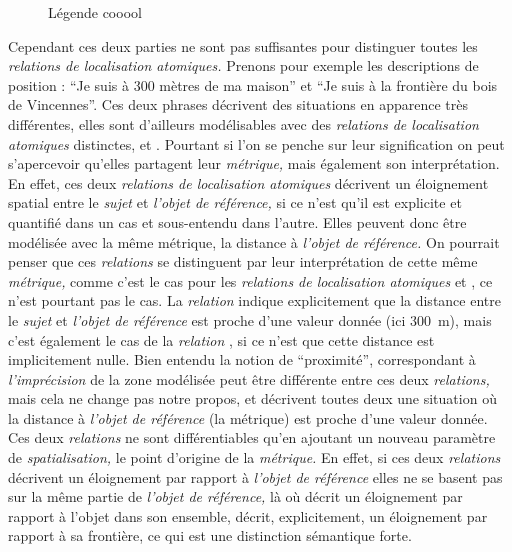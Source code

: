 \begin{figure}
  \centering
  
  \caption{Légende cooool}
  \label{fig:Exemple_Metrique_vs_Selecteur}
\end{figure}

Cependant ces deux parties ne sont pas suffisantes pour distinguer toutes les \emph{relations de localisation atomiques.} Prenons pour exemple les descriptions de position : \enquote{Je suis à 300 mètres de ma maison} et \enquote{Je suis à la frontière du bois de Vincennes}. Ces deux phrases décrivent des situations en apparence très différentes, elles sont d'ailleurs modélisables avec des \emph{relations de localisation atomiques} distinctes,  et . Pourtant si l'on se penche sur leur signification on peut s’apercevoir qu'elles partagent leur \emph{métrique,} mais également son interprétation. En effet, ces deux \emph{relations de localisation atomiques} décrivent un éloignement spatial entre le \emph{sujet} et \emph{l'objet de référence,} si ce n'est qu'il est explicite et quantifié dans un cas et sous-entendu dans l'autre. Elles peuvent donc être modélisée avec la même métrique, la distance à \emph{l'objet de référence.} On pourrait penser que ces \emph{relations} se distinguent par leur interprétation de cette même \emph{métrique,} comme c'est le cas pour les \emph{relations de localisation atomiques}  et , ce n'est pourtant pas le cas. La \emph{relation}  indique explicitement que la distance entre le \emph{sujet} et \emph{l'objet de référence} est proche d'une valeur donnée (ici \SI{300}{\meter}), mais c'est également le cas de la \emph{relation} , si ce n'est que cette distance est implicitement nulle. Bien entendu la notion de \enquote{proximité}, correspondant à \emph{l'imprécision} de la zone modélisée peut être différente entre ces deux \emph{relations,} mais cela ne change pas notre propos,  et  décrivent toutes deux une situation où la distance à \emph{l'objet de référence} (\ie la métrique) est proche d'une valeur donnée. Ces deux \emph{relations} ne sont différentiables qu'en ajoutant un nouveau paramètre de \emph{spatialisation,} le point d'origine de la \emph{métrique.} En effet, si ces deux \emph{relations} décrivent un éloignement par rapport à \emph{l'objet de référence} elles ne se basent pas sur la même partie de \emph{l'objet de référence,} là où  décrit un éloignement par rapport à l'objet dans son ensemble,  décrit, explicitement, un éloignement par rapport à sa frontière, ce qui est une distinction sémantique forte.

